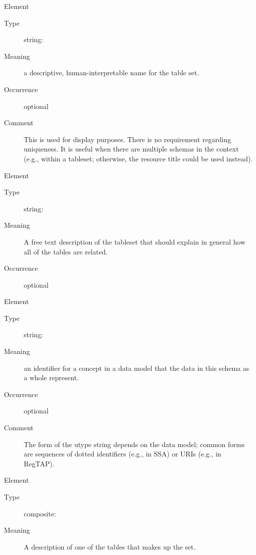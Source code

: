 \documentclass[11pt,a4paper]{ivoa}
\begin{document}
\begin{generated}
\begin{bigdescription}
\begin{description}
\end{description}
\item[Element \xmlel{title}]
\begin{description}
\item[Type] string: 
\item[Meaning] 
                  a descriptive, human-interpretable name for the table set.
               
\item[Occurrence] optional
\item[Comment] 
                  This is used for display purposes.  There is no requirement
                  regarding uniqueness.  It is useful when there are
                  multiple schemas in the context (e.g., within a
                  tableset; otherwise, the resource title could be
                  used instead).
               

\end{description}
\item[Element \xmlel{description}]
\begin{description}
\item[Type] string: 
\item[Meaning] 
               A free text description of the tableset that should
               explain in general how all of the tables are related.
             
\item[Occurrence] optional

\end{description}
\item[Element \xmlel{utype}]
\begin{description}
\item[Type] string: 
\item[Meaning] 
                  an identifier for a concept in a data model that
                  the data in this schema as a whole represent.  
               
\item[Occurrence] optional
\item[Comment] 
                  The form of the utype string depends on the data
                  model; common forms are sequences of dotted identifiers
                  (e.g., in SSA) or URIs (e.g., in RegTAP).
               

\end{description}
\item[Element \xmlel{table}]
\begin{description}
\item[Type] composite: 
\item[Meaning] 
               A description of one of the tables that makes up the set.
             

\end{description}
\end{bigdescription}
\end{generated}
\end{document}
